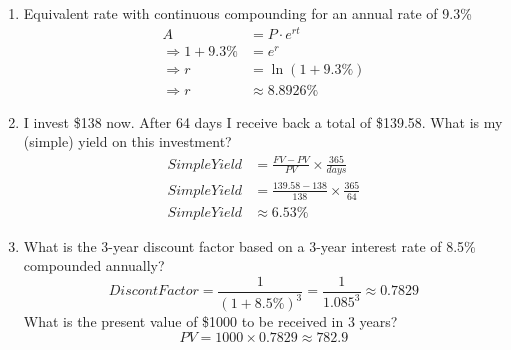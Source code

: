 \begin{enumerate}
    \item Equivalent rate with continuous compounding for an annual rate of 9.3\%
          \begin{equation}
              \begin{aligned}
                  A                     & = P \cdot e^{rt} \\
                  \Rightarrow 1 + 9.3\% & = e^{r}          \\
                  \Rightarrow r         & = \ln(1 + 9.3\%) \\
                  \Rightarrow r         & \approx 8.8926\%
              \end{aligned}
          \end{equation}

    \item I invest \$138 now. After 64 days I receive back a total of \$139.58. What is my (simple) yield on this investment?
            \begin{equation}
                \begin{aligned}
                    Simple Yield & = \frac{FV - PV}{PV} \times \frac{365}{days} \\
                    Simple Yield & = \frac{139.58 - 138}{138} \times \frac{365}{64} \\
                    Simple Yield & \approx 6.53\%
                \end{aligned}
            \end{equation}

    \item What is the 3-year discount factor based on a 3-year interest rate of 8.5\% compounded annually?
          \begin{equation}
              Discont Factor = \frac{1}{(1 + 8.5\%)^3} = \frac{1}{1.085^3} \approx 0.7829
            \end{equation}
          What is the present value of \$1000 to be received in 3 years?
            \begin{equation}
                PV = 1000 \times 0.7829 \approx 782.9
            \end{equation}

\end{enumerate}

\newpage